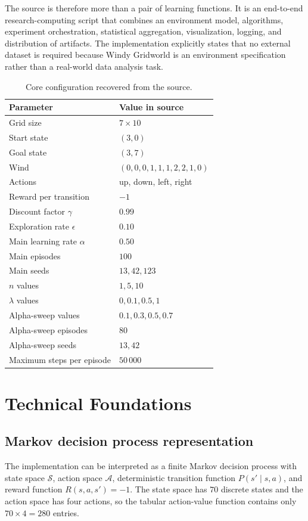\documentclass[11pt,a4paper]{article}
\begin{document}
The source is therefore more than a pair of learning functions. It is an end-to-end research-computing script that combines an environment model, algorithms, experiment orchestration, statistical aggregation, visualization, logging, and distribution of artifacts. The implementation explicitly states that no external dataset is required because Windy Gridworld is an environment specification rather than a real-world data analysis task.

\begin{table}[h]
\centering
\caption{Core configuration recovered from the source.}
\begin{tabular}{@{}ll@{}}
\toprule
Parameter & Value in source \\
\midrule
Grid size & $7\times10$ \\
Start state & $(3,0)$ \\
Goal state & $(3,7)$ \\
Wind & $(0,0,0,1,1,1,2,2,1,0)$ \\
Actions & up, down, left, right \\
Reward per transition & $-1$ \\
Discount factor $\gamma$ & $0.99$ \\
Exploration rate $\epsilon$ & $0.10$ \\
Main learning rate $\alpha$ & $0.50$ \\
Main episodes & $100$ \\
Main seeds & $13,42,123$ \\
$n$ values & $1,5,10$ \\
$\lambda$ values & $0,0.1,0.5,1$ \\
Alpha-sweep values & $0.1,0.3,0.5,0.7$ \\
Alpha-sweep episodes & $80$ \\
Alpha-sweep seeds & $13,42$ \\
Maximum steps per episode & $50\,000$ \\
\bottomrule
\end{tabular}
\end{table}

\section{Technical Foundations}
\subsection{Markov decision process representation}
The implementation can be interpreted as a finite Markov decision process with state space $\mathcal{S}$, action space $\mathcal{A}$, deterministic transition function $P(s'\mid s,a)$, and reward function $R(s,a,s')=-1$. The state space has $70$ discrete states and the action space has four actions, so the tabular action-value function contains only $70\times4=280$ entries.
\end{document}
